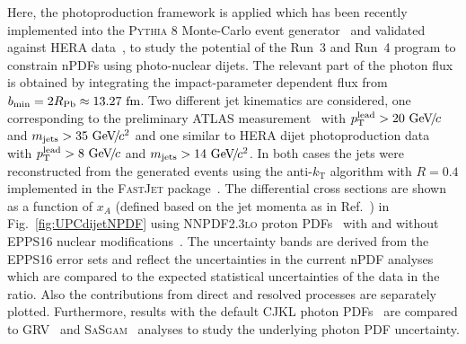 \documentclass[../report.tex]{subfiles}
\begin{document}
Here, the photoproduction framework is applied which has been recently implemented into the \textsc{Pythia 8} Monte-Carlo event generator~\cite{Sjostrand:2014zea} and validated against HERA data~\cite{Helenius:2018bai}, to study the potential of the Run~3 and Run~4 program to constrain nPDFs using photo-nuclear dijets. The relevant part of the photon flux is obtained by integrating the impact-parameter dependent flux from $b_{\mathrm{min}}=2 R_{\mathrm{Pb}} \approx 13.27~\text{fm}$. Two different jet kinematics are considered, one corresponding to the preliminary ATLAS measurement~\cite{ATLAS:2017kwa} with $p\sb{\scriptstyle\mathrm{T}}^{\mathrm{lead}}>20~\text{GeV}\!/\mspace{-2mu}c$ and $m_{\mathrm{jets}} > 35~\text{GeV}\!/\mspace{-2mu}c^2$ and one similar to HERA dijet photoproduction data~\cite{Derrick:1996zy,Adloff:2000bs} with $p\sb{\scriptstyle\mathrm{T}}^{\mathrm{lead}}>8~\text{GeV}\!/\mspace{-2mu}c$ and $m_{\mathrm{jets}} > 14~\text{GeV}\!/\mspace{-2mu}c^2$. In both cases the jets were reconstructed from the generated events using the anti-$k_{\mathrm{T}}$ algorithm with $R = 0.4$ implemented in the \textsc{FastJet} package~\cite{Cacciari:2011ma}. The differential cross sections are shown as a function of $x_A$ (defined based on the jet momenta as in Ref.~\cite{ATLAS:2017kwa}) in Fig.~\ref{fig:UPCdijetNPDF} using \textsc{NNPDF2.3lo} proton PDFs~\cite{Ball:2012cx} with and without EPPS16 nuclear modifications~\cite{Eskola:2016oht}. The uncertainty bands are derived from the EPPS16 error sets and reflect the uncertainties in the current nPDF analyses which are compared to the expected statistical uncertainties of the data in the ratio. Also the contributions from direct and resolved processes are separately plotted. Furthermore, results with the default CJKL photon PDFs~\cite{Cornet:2002iy} are compared to GRV~\cite{Gluck:1991jc} and \textsc{SaSgam}~\cite{Schuler:1995fk} analyses to study the underlying photon PDF uncertainty.
\end{document}
